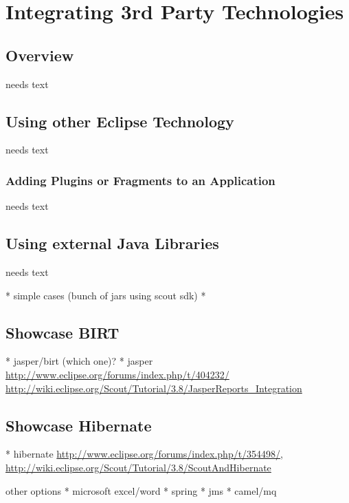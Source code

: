 \documentclass[a4paper,10pt,twoside]{book}
\begin{document}
  \sloppy
\fi


\chapter{Integrating 3rd Party Technologies}

\section{Overview}
needs text

\section{Using other Eclipse Technology}
needs text

\subsection{Adding Plugins or Fragments to an Application}
needs text

\section{Using external Java Libraries}
needs text

  * simple cases (bunch of jars using scout sdk)
  * 
  
\section{Showcase BIRT}
  * jasper/birt (which one)?
  * jasper \url{http://www.eclipse.org/forums/index.php/t/404232/} 
   \url{http://wiki.eclipse.org/Scout/Tutorial/3.8/JasperReports_Integration}
  
\section{Showcase Hibernate}  
* hibernate \url{http://www.eclipse.org/forums/index.php/t/354498/}, \url{http://wiki.eclipse.org/Scout/Tutorial/3.8/ScoutAndHibernate}

other options
  * microsoft excel/word
  * spring
  * jms
  * camel/mq
 
 
\ifx\wholebook\relax\else
   
   
\end{document}
